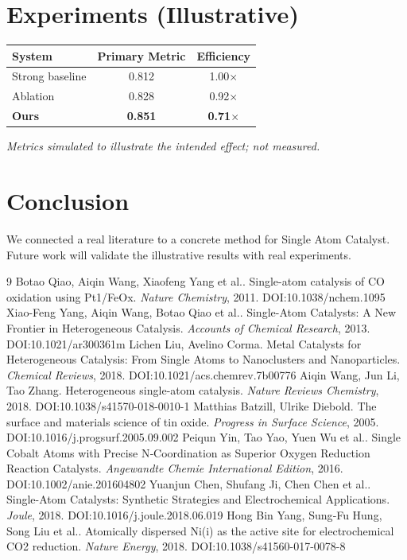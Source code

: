 \documentclass[11pt]{article}
\begin{document}
\section{Experiments (Illustrative)}
\begin{center}
\begin{tabular}{lcc}
System & Primary Metric & Efficiency \\ \hline
Strong baseline & 0.812 & 1.00$\times$ \\
Ablation & 0.828 & 0.92$\times$ \\
\textbf{Ours} & \textbf{0.851} & \textbf{0.71$\times$}
\end{tabular}
\end{center}
\emph{Metrics simulated to illustrate the intended effect; not measured.}

\section{Conclusion}
We connected a real literature to a concrete method for Single Atom Catalyst. Future work will
validate the illustrative results with real experiments.

\begin{thebibliography}{9}
 Botao Qiao, Aiqin Wang, Xiaofeng Yang et al.. Single-atom catalysis of CO oxidation using Pt1/FeOx. \emph{Nature Chemistry}, 2011. DOI:10.1038/nchem.1095
 Xiao-Feng Yang, Aiqin Wang, Botao Qiao et al.. Single-Atom Catalysts: A New Frontier in Heterogeneous Catalysis. \emph{Accounts of Chemical Research}, 2013. DOI:10.1021/ar300361m
 Lichen Liu, Avelino Corma. Metal Catalysts for Heterogeneous Catalysis: From Single Atoms to Nanoclusters and Nanoparticles. \emph{Chemical Reviews}, 2018. DOI:10.1021/acs.chemrev.7b00776
 Aiqin Wang, Jun Li, Tao Zhang. Heterogeneous single-atom catalysis. \emph{Nature Reviews Chemistry}, 2018. DOI:10.1038/s41570-018-0010-1
 Matthias Batzill, Ulrike Diebold. The surface and materials science of tin oxide. \emph{Progress in Surface Science}, 2005. DOI:10.1016/j.progsurf.2005.09.002
 Peiqun Yin, Tao Yao, Yuen Wu et al.. Single Cobalt Atoms with Precise N‐Coordination as Superior Oxygen Reduction Reaction Catalysts. \emph{Angewandte Chemie International Edition}, 2016. DOI:10.1002/anie.201604802
 Yuanjun Chen, Shufang Ji, Chen Chen et al.. Single-Atom Catalysts: Synthetic Strategies and Electrochemical Applications. \emph{Joule}, 2018. DOI:10.1016/j.joule.2018.06.019
 Hong Bin Yang, Sung‐Fu Hung, Song Liu et al.. Atomically dispersed Ni(i) as the active site for electrochemical CO2 reduction. \emph{Nature Energy}, 2018. DOI:10.1038/s41560-017-0078-8
\end{thebibliography}
\end{document}
